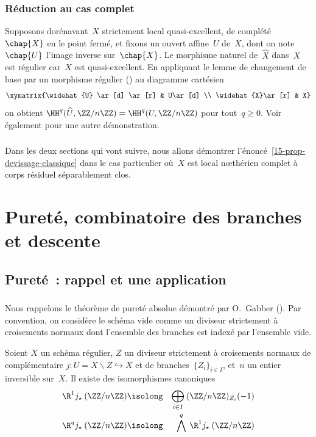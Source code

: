 \documentclass[10pt]{../fichiers-configuration-latex/smfart}
\begin{document}
\subsubsection{Réduction au cas complet}
Supposons dorénavant $X$ strictement local quasi-excellent,
de complété $\chap{X}$ en le point fermé, et
fixons un ouvert affine $U$ de $X$, dont on
note $\chap{U}$ l'image inverse sur $\chap{X}$.
Le morphisme naturel de~$\widehat{X}$ dans~$X$ est régulier car~$X$ est quasi-excellent.
En appliquant le lemme de changement de base par
un morphisme régulier () au diagramme cartésien
$$\xymatrix{\widehat{U} \ar[d] \ar[r] & U\ar[d] \\
\widehat{X}\ar[r] & X}$$
on obtient $\HH^q(\widehat{U},\ZZ/n\ZZ)=\HH^q({U},\ZZ/n\ZZ)$
pour tout~$q\geq 0$. Voir également \cite[7.1.1]{TUBULAR@Fujiwara}
pour une autre démonstration.

\subsubsection{}Dans les deux sections qui vont suivre, nous
allons démontrer l'énoncé \ref{15-prop-devissage-classique}
dans le cas particulier où $X$ est local nœthérien complet à
corps résiduel séparablement clos.

\section{Pureté, combinatoire des branches et descente}
\label{15-section pureté et combinatoire}

\subsection{Pureté : rappel et une application}

\subsubsection{}Nous rappelons le théorème de pureté absolue démontré par O. Gabber
(\cite{AZUMINO@Fujiwara}). Par convention, on considère le schéma vide
comme un diviseur strictement à croisements normaux dont
l'ensemble des branches est indexé par l'ensemble vide.

\begin{theoreme2}\label{15-theoreme-purete-rappel}
Soient $X$ un schéma régulier, $Z$ un diviseur strictement à
croisements normaux de complémentaire $j:U = X\backslash Z
\hookrightarrow X$ et de branches~$\{Z_i\}_{i\in I}$, et~$n$ un entier inversible sur~$X$. Il existe des isomorphismes canoniques
\begin{eqnarray*}
\R^1j_{\star}\: (\ZZ/n\ZZ) & \isolong & \bigoplus_{i\in I} \: (\ZZ/n\ZZ)_{Z_i}(-1) \\
\R^qj_{\star}\: (\ZZ/n\ZZ) & \isolong & \bigwedge^q\: \R^1 j_{\star}\: (\ZZ/n\ZZ)
\end{eqnarray*}
\end{theoreme2}
\end{document}
